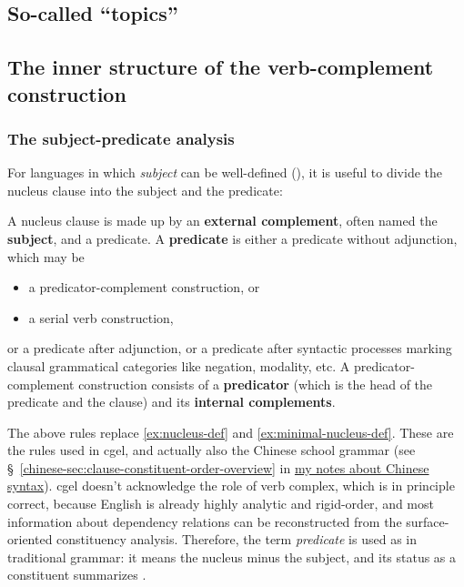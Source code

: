 \documentclass[UTF8, a4paper, oneside, scheme=plain]{ctexart}
\newcommand*{\citesec}[1]{\S~{#1}}
\newcommand*{\concept}[1]{\textbf{#1}}
\newcommand*{\term}[1]{\emph{#1}}
\newcommand{\chinesenote}{\href{../Chinese/main.pdf}{my notes about Chinese syntax}}
\begin{document}
\subsection{So-called ``topics''}


\subsection{The inner structure of the verb-complement construction}

\subsubsection{The subject-predicate analysis}

For languages in which \term{subject} can be well-defined (),
it is useful to divide the nucleus clause into 
the subject and the predicate:
\begin{exe}
    \ex\label{ex:subject-predicate} A nucleus clause is made up by an \concept{external complement}, often named the \concept{subject},
    and a predicate.
    \ex\label{ex:predicate-as-vp} A \concept{predicate} is either a predicate without adjunction, which may be 
    \begin{itemize}
        \item a predicator-complement construction, or 
        \item a serial verb construction, 
    \end{itemize} 
    or a predicate after adjunction,
    or a predicate after syntactic processes marking clausal grammatical categories like 
    negation, modality, etc.
    \ex\label{ex:predicator-complement} A predicator-complement construction consists of 
    a \concept{predicator} (which is the head of the predicate and the clause) 
    and its \concept{internal complements}.
\end{exe}

The above rules replace \eqref{ex:nucleus-def} and \eqref{ex:minimal-nucleus-def}.
These are the rules used in \ac{cgel}, and actually also the Chinese school grammar
(see \citesec{\ref{chinese-sec:clause-constituent-order-overview}} in \chinesenote).
\ac{cgel} doesn't acknowledge the role of verb complex,
which is in principle correct, 
because English is already highly analytic and rigid-order,
and most information about dependency relations can be reconstructed 
from the surface-oriented constituency analysis.
Therefore, the term \term{predicate} is used as in traditional grammar:
it means the nucleus minus the subject, 
and its status as a constituent summarizes .
\end{document}
